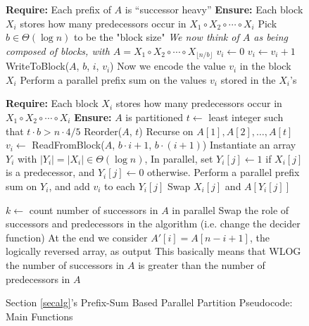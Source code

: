 \documentclass[sigplan, 10pt, nonacm]{acmart}
\theoremstyle{remark}
\theoremstyle{remark}
\begin{document}
\begin{appendices}
\begin{figure*}
  \caption{Section \ref{secalg}'s Prefix-Sum Based Parallel Partition Pseudocode: Main Functions}
	\label{alg:parallelPartition_prefixsumbased_main}
  \begin{algorithmic} %
    \State \textbf{Require: } Each prefix of $A$ is ``successor heavy''
    \State \textbf{Ensure: }  Each block $X_i$ stores how many predecessors occur in $X_1 \circ X_2 \circ \cdots \circ X_i$
      \State Pick $b \in \Theta(\log n)$ to be the "block size"
      \Comment \emph{We now think of $A$ as being composed of blocks, with $A = X_1 \circ X_2 \circ \cdots \circ X_{\lfloor n/b \rfloor}$}
        \State $v_i \gets 0$  
            \State $v_i \gets v_i + 1$
          \EndIf
        \EndFor
        \State WriteToBlock($A$, $b$, $i$, $v_i$)
        \Comment Now we encode the value $v_i$ in the block $X_i$
      \EndFor
      \State Perform a parallel prefix sum on the values $v_i$ stored in the $X_i$'s
   \EndProcedure
    \State

  \State \textbf{Require: } Each block $X_i$ stores how many predecessors occur in $X_1 \circ X_2 \circ \cdots \circ X_i$
  \State \textbf{Ensure: }  $A$ is partitioned
      \State $t \gets $ least integer such that $t\cdot b > n\cdot 4/5$
      \State Reorder($A$, $t$)
      \Comment Recurse on $A[1], A[2], \ldots, A[t]$
      \State $v_i \gets$ ReadFromBlock($A$, $b\cdot i+1$, $b\cdot(i+1)$) 
        \State Instantiate an array $Y_i$ with $|Y_i| = |X_i| \in \Theta(\log n)$, 
        \State In parallel, set $Y_i[j] \gets 1$ if $X_i[j]$ is a predecessor, and $Y_i[j] \gets 0$ otherwise.
        \State Perform a parallel prefix sum on $Y_i$, and add $v_i$ to each $Y_i[j]$
            \State Swap $X_i[j]$ and $A[Y_i[j]]$
          \EndIf
        \EndFor
      \EndFor
    \EndProcedure
    \State

      \State $k \gets$ count number of successors in $A$ in parallel
        \State Swap the role of successors and predecessors in the algorithm (i.e. change the decider function)
        \State At the end we consider $A'[i] = A[n-i+1]$, the logically reversed array, as output
        \State This basically means that WLOG the number of successors in $A$ is greater than the number of predecessors in $A$
      \EndIf


\end{algorithmic}
\end{figure*}
\end{appendices}
\end{document}
